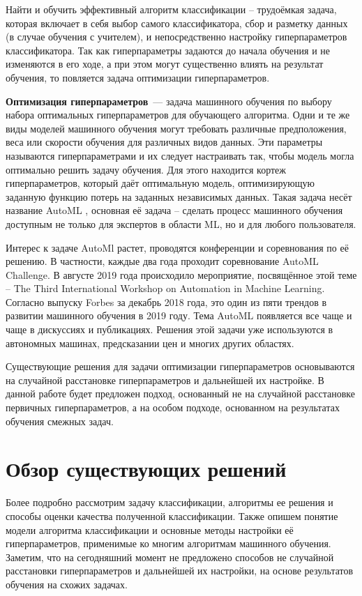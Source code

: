 \documentclass[times,specification,annotation]{itmo-student-thesis}
\begin{document}
	Найти и обучить эффективный алгоритм классификации -- трудоёмкая задача, которая включает в себя выбор самого классификатора, сбор и разметку данных (в случае обучения с учителем), и непосредственно настройку гиперпараметров классификатора. Так как гиперпараметры задаются до начала обучения и не изменяются в его ходе, а при этом могут существенно влиять на результат обучения, то повляется задача оптимизации гиперпараметров. \par
	

	\textbf{Оптимизация гиперпараметров} — задача машинного обучения по выбору набора оптимальных гиперпараметров для обучающего алгоритма. Одни и те же виды моделей машинного обучения могут требовать различные предположения, веса или скорости обучения для различных видов данных. Эти параметры называются гиперпараметрами и их следует настраивать так, чтобы модель могла оптимально решить задачу обучения. Для этого находится кортеж гиперпараметров, который даёт оптимальную модель, оптимизирующую заданную функцию потерь на заданных независимых данных. Такая задача несёт название AutoML \cite{feurer-automlbook19a}, основная её задача -- сделать процесс машинного обучения доступным не только для экспертов в области ML, но и для любого пользователя. 
	
	Интерес к задаче AutoMl растет, проводятся конференции и соревнования по её решению. В частности, каждые два года проходит соревнование AutoML Challenge. В августе 2019 года происходило мероприятие, посвящённое этой теме -- The Third International Workshop on Automation in Machine Learning. Согласно выпуску Forbes за декабрь 2018 года, это один из пяти трендов в развитии машинного обучения в 2019 году. Тема AutoML появляется все чаще и чаще в дискуссиях и публикациях. Решения этой задачи уже используются в автономных машинах, предсказании цен и многих других областях.
	
	Существующие решения \cite{lindauer2017warmstarting, HutHooLey10-TR, NIPS2015_5872, falkner-icml-18} для задачи оптимизации гиперпараметров основываются на случайной расстановке гиперпараметров и дальнейшей их настройке. В данной работе будет предложен подход, основанный не на случайной расстановке первичных гиперпараметров, а на особом подходе, основанном на результатах обучения смежных задач.\par

	
	\chapter{Обзор существующих решений}\label{chp1}
	Более подробно рассмотрим задачу классификации, алгоритмы ее решения и способы оценки качества полученной классификации. Также опишем понятие модели алгоритма классификации и основные методы настройки её гиперпараметров, применимые ко многим алгоритмам машинного обучения.
	Заметим, что на сегодняшний момент не предложено способов не случайной расстановки гиперпараметров и дальнейшей их настройки, на основе результатов обучения на схожих задачах.
	\startrelatedwork
	
\end{document}
